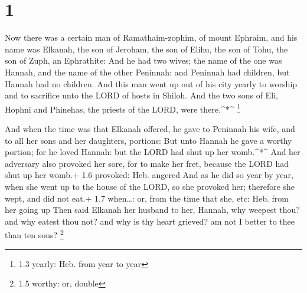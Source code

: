 \hypertarget{section}{%
\section{1}\label{section}}

 Now there was a certain man of Ramathaim-zophim, of mount
Ephraim, and his name was Elkanah, the son of Jeroham, the son of Elihu,
the son of Tohu, the son of Zuph, an Ephrathite:  And he had
two wives; the name of the one was Hannah, and the name of the other
Peninnah: and Peninnah had children, but Hannah had no children.
 And this man went up out of his city yearly to worship and
to sacrifice unto the LORD of hosts in Shiloh. And the two sons of Eli,
Hophni and Phinehas, the priests of the LORD, were there.\^{}*\^{}
\footnote{1.3 yearly: Heb. from year to year}

 And when the time was that Elkanah offered, he gave to
Peninnah his wife, and to all her sons and her daughters, portions:
 But unto Hannah he gave a worthy portion; for he loved
Hannah: but the LORD had shut up her womb.\^{}*\^{}  And her
adversary also provoked her sore, for to make her fret, because the LORD
had shut up her womb.+ 1.6 provoked: Heb. angered  And as he
did so year by year, when she went up to the house of the LORD, so she
provoked her; therefore she wept, and did not eat.+ 1.7 when\ldots: or,
from the time that she, etc: Heb. from her going up  Then
said Elkanah her husband to her, Hannah, why weepest thou? and why
eatest thou not? and why is thy heart grieved? am not I better to thee
than ten sons? \footnote{1.5 worthy: or, double}

